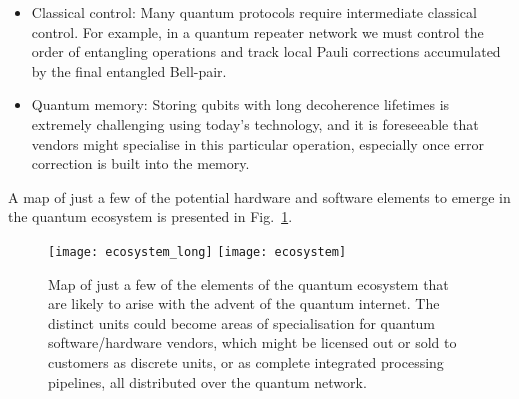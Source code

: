 \begin{itemize}
\item Classical control: Many quantum protocols require intermediate classical control. For example, in a quantum repeater network we must control the order of entangling operations and track local Pauli corrections accumulated by the final entangled Bell-pair.

\item Quantum memory: Storing qubits with long decoherence lifetimes is extremely challenging using today's technology, and it is foreseeable that vendors might specialise in this particular operation, especially once error correction is built into the memory. 
\end{itemize}

A map of just a few of the potential hardware and software elements to emerge in the quantum ecosystem is presented in Fig.~\ref{fig:ecosystem}.

\begin{figure}[!htpb]
\pubmode
\texttt{[image: ecosystem\_long]}
\else
\texttt{[image: ecosystem]}
\fi
\caption{Map of just a few of the elements of the quantum ecosystem that are likely to arise with the advent of the quantum internet. The distinct units could become areas of specialisation for quantum software/hardware vendors, which might be licensed out or sold to customers as discrete units, or as complete integrated processing pipelines, all distributed over the quantum network.}\label{fig:ecosystem}	
\end{figure}